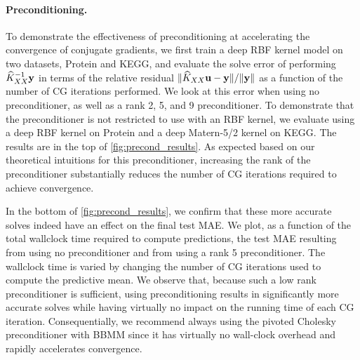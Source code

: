 \paragraph{Preconditioning.}
To demonstrate the effectiveness of preconditioning at accelerating the convergence of conjugate gradients, we first train a deep RBF kernel model on two datasets, Protein and KEGG, and evaluate the solve error of performing $\widehat{K}_{XX}^{-1}\mathbf{y}$ in terms of the relative residual $\Vert \widehat{K}_{XX}\mathbf{u} - \mathbf{y} \Vert / \Vert \mathbf{y} \Vert$ as a function of the number of CG iterations performed.
We look at this error when using no preconditioner, as well as a rank 2, 5, and 9 preconditioner.
To demonstrate that the preconditioner is not restricted to use with an RBF kernel, we evaluate using a deep RBF kernel on Protein and a deep Matern-5/2 kernel on KEGG.
The results are in the top of \cref{fig:precond_results}.
As expected based on our theoretical intuitions for this preconditioner, increasing the rank of the preconditioner substantially reduces the number of CG iterations required to achieve convergence.

In the bottom of \cref{fig:precond_results}, we confirm that these more accurate solves indeed have an effect on the final test MAE.
We plot, as a function of the total wallclock time required to compute predictions, the test MAE resulting from using no preconditioner and from using a rank 5 preconditioner.
The wallclock time is varied by changing the number of CG iterations used to compute the predictive mean.
We observe that, because such a low rank preconditioner is sufficient, using preconditioning results in significantly more accurate solves while having virtually no impact on the running time of each CG iteration.
Consequentially, we recommend always using the pivoted Cholesky preconditioner with BBMM since it has virtually no wall-clock overhead and rapidly accelerates convergence.
